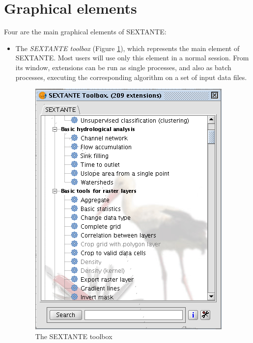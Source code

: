 \documentclass[12pt,a4paper,twocolumn]{article}
\begin{document}
 
\section{Graphical elements}

Four are the main graphical elements of SEXTANTE:

\begin{itemize}
	\item The \emph{SEXTANTE toolbox} (Figure \ref{Fig:ExtensionManager}), which represents the main element of SEXTANTE. Most users will use only this element in a normal session. From its window, extensions can be run as single processes, and also as batch processes, executing the corresponding algorithm on a set of input data files.

\begin{figure}[!hbt]
 \centering
 \includegraphics[width=.9\columnwidth]{ExtensionManager.png}
\caption{The SEXTANTE toolbox}
\label{Fig:ExtensionManager}
\end{figure}


\end{itemize}
\end{document}
